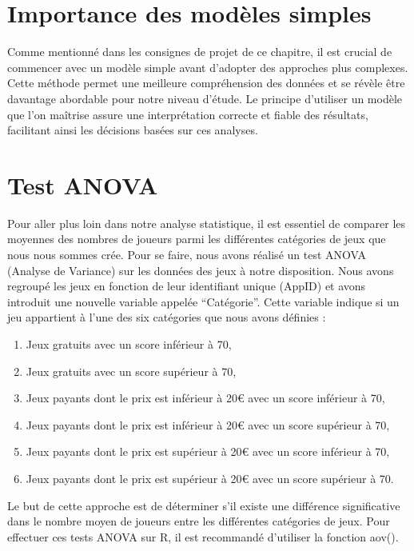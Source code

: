 \documentclass[mstat,12pt]{unswthesis}
\begin{document}
\hypertarget{importance-des-moduxe8les-simples}{%
\section{Importance des modèles
simples}\label{importance-des-moduxe8les-simples}}

Comme mentionné dans les consignes de projet de ce chapitre, il est
crucial de commencer avec un modèle simple avant d'adopter des approches
plus complexes. Cette méthode permet une meilleure compréhension des
données et se révèle être davantage abordable pour notre niveau d'étude.
Le principe d'utiliser un modèle que l'on maîtrise assure une
interprétation correcte et fiable des résultats, facilitant ainsi les
décisions basées sur ces analyses.

\hypertarget{test-anova}{%
\section{Test ANOVA}\label{test-anova}}

Pour aller plus loin dans notre analyse statistique, il est essentiel de
comparer les moyennes des nombres de joueurs parmi les différentes
catégories de jeux que nous nous sommes crée. Pour se faire, nous avons
réalisé un test ANOVA (Analyse de Variance) sur les données des jeux à
notre disposition. Nous avons regroupé les jeux en fonction de leur
identifiant unique (AppID) et avons introduit une nouvelle variable
appelée ``Catégorie''. Cette variable indique si un jeu appartient à
l'une des six catégories que nous avons définies :

\begin{enumerate}
\item Jeux gratuits avec un score inférieur à 70,
\item Jeux gratuits avec un score supérieur à 70, 
\item Jeux payants dont le prix est inférieur à 20€ avec un score inférieur à 70,
\item Jeux payants dont le prix est inférieur à 20€ avec un score supérieur à 70,
\item Jeux payants dont le prix est supérieur à 20€ avec un score inférieur à 70,
\item Jeux payants dont le prix est supérieur à 20€ avec un score supérieur à 70.
\end {enumerate}
\bigskip

Le but de cette approche est de déterminer s'il existe une différence
significative dans le nombre moyen de joueurs entre les différentes
catégories de jeux. Pour effectuer ces tests ANOVA sur R, il est
recommandé d'utiliser la fonction aov().
\end{document}
